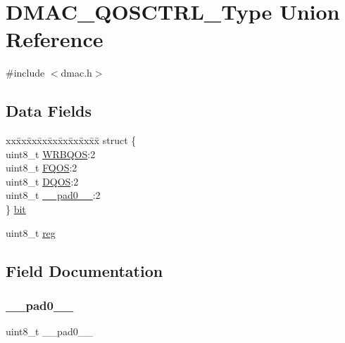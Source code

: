 \hypertarget{union_d_m_a_c___q_o_s_c_t_r_l___type}{}\section{D\+M\+A\+C\+\_\+\+Q\+O\+S\+C\+T\+R\+L\+\_\+\+Type Union Reference}
\label{union_d_m_a_c___q_o_s_c_t_r_l___type}


{\ttfamily \#include $<$dmac.\+h$>$}

\subsection*{Data Fields}
\begin{DoxyCompactItemize}
\item 
\begin{tabbing}
xx\=xx\=xx\=xx\=xx\=xx\=xx\=xx\=xx\=\kill
struct \{\\
\>uint8\_t \mbox{\hyperlink{union_d_m_a_c___q_o_s_c_t_r_l___type_a8bce9c5648121724da0f9948f309e198}{WRBQOS}}:2\\
\>uint8\_t \mbox{\hyperlink{union_d_m_a_c___q_o_s_c_t_r_l___type_ae6601511ecdde325ffc4c1800f0eaf62}{FQOS}}:2\\
\>uint8\_t \mbox{\hyperlink{union_d_m_a_c___q_o_s_c_t_r_l___type_adcbd494146bcd1226ac183aba7367698}{DQOS}}:2\\
\>uint8\_t \mbox{\hyperlink{union_d_m_a_c___q_o_s_c_t_r_l___type_a8b4eebe79ded0459acec2f4950102ba3}{\_\_pad0\_\_}}:2\\
\} \mbox{\hyperlink{union_d_m_a_c___q_o_s_c_t_r_l___type_ae81872486c96ee366cfd421f429d2a77}{bit}}\\

\end{tabbing}\item 
uint8\+\_\+t \mbox{\hyperlink{union_d_m_a_c___q_o_s_c_t_r_l___type_a9428adc9af4653a2050e2536b55dec8d}{reg}}
\end{DoxyCompactItemize}


\subsection{Field Documentation}
\mbox{\label{union_d_m_a_c___q_o_s_c_t_r_l___type_a8b4eebe79ded0459acec2f4950102ba3}} 
\subsubsection{\texorpdfstring{\_\_pad0\_\_}{\_\_pad0\_\_}}
{\footnotesize\ttfamily uint8\+\_\+t \+\_\+\+\_\+pad0\+\_\+\+\_\+}

